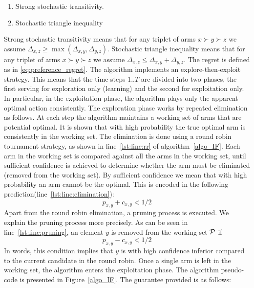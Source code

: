 \documentclass{llncs}
\begin{document}
	\begin{enumerate}

		\item Strong stochastic transitivity.

		\item Stochastic triangle inequality

	\end{enumerate}
	Strong stochastic transitivity means that for any triplet of arms $x \succ y \succ z$ we assume $\Delta_{x,z} \geq \max(\Delta_{x,y},\Delta_{y,z})$.
	Stochastic triangle inequality means that for any triplet of arms $x \succ y \succ z$ we assume $\Delta_{x,z} \leq \Delta_{x,y} + \Delta_{y,z}$.
	The regret is defined as in \eqref{eq:preference_regret}.
	The algorithm implements an explore-then-exploit strategy. 
	This means that the time steps $1..T$ are divided into two phases, the first serving for exploration only (learning) and the second for exploitation only. 
	In particular, in the exploitation phase, the algorithm plays only the apparent optimal action consistently.
	The exploration phase works by repeated elimination as follows. 
	At each step the algorithm maintains a working set of arms that are potential optimal. 
	It is shown that with high probability the true optimal arm is consistently in the working set. 
	The elimination is done using a round robin tournament strategy, as shown in line~\ref{lst:line:rr} of algorithm~\ref{algo_IF}. 
	Each arm in the working set is compared against all the arms in the working set, until sufficient confidence is achieved to determine whether the arm must be eliminated (removed from the working set). 
	By sufficient confidence we mean that with high probability an arm cannot be the optimal. This is encoded in the following prediction(line~\ref{lst:line:elimination}):
	 $$p_{x,y}+c_{x,y}<1/2$$
	Apart from the round robin elimination, a pruning process is executed.
	We explain the pruning process more precisely. 
	As can be seen in line~\ref{lst:line:pruning}, an element $y$ is removed from the working set $\cal P$ if $$p_{x,y}-c_{x,y}<1/2$$ 
	In words, this condition implies that $y$ is with high confidence inferior compared to the current candidate in the round robin.
	Once a single arm is left in the working set, the algorithm enters the exploitation phase.
	The algorithm pseudo-code is presented in Figure~\ref{algo_IF}. 
	The guarantee provided is as follows:
\end{document}
